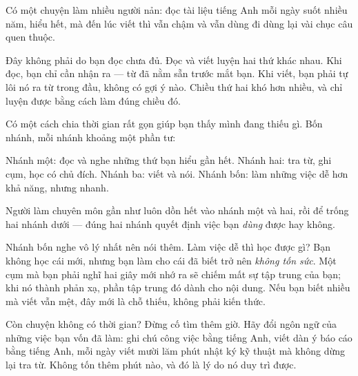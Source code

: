 \documentclass[../../english.tex]{subfiles}
\begin{document}
\begin{dongian}
Có một chuyện làm nhiều người nản: đọc tài liệu tiếng Anh mỗi ngày suốt nhiều năm, hiểu hết, mà đến lúc viết thì vẫn chậm và vẫn dùng đi dùng lại vài chục câu quen thuộc.

Đây không phải do bạn đọc chưa đủ. Đọc và viết luyện hai thứ khác nhau. Khi đọc, bạn chỉ cần nhận ra --- từ đã nằm sẵn trước mắt bạn. Khi viết, bạn phải tự lôi nó ra từ trong đầu, không có gợi ý nào. Chiều thứ hai khó hơn nhiều, và chỉ luyện được bằng cách làm đúng chiều đó.

Có một cách chia thời gian rất gọn giúp bạn thấy mình đang thiếu gì. Bốn nhánh, mỗi nhánh khoảng một phần tư:

Nhánh một: đọc và nghe những thứ bạn hiểu gần hết. Nhánh hai: tra từ, ghi cụm, học có chủ đích. Nhánh ba: viết và nói. Nhánh bốn: làm những việc dễ hơn khả năng, nhưng nhanh.

Người làm chuyên môn gần như luôn dồn hết vào nhánh một và hai, rồi để trống hai nhánh dưới --- đúng hai nhánh quyết định việc bạn \emph{dùng} được hay không.

Nhánh bốn nghe vô lý nhất nên nói thêm. Làm việc dễ thì học được gì? Bạn không học cái mới, nhưng bạn làm cho cái đã biết trở nên \emph{không tốn sức}. Một cụm mà bạn phải nghĩ hai giây mới nhớ ra sẽ chiếm mất sự tập trung của bạn; khi nó thành phản xạ, phần tập trung đó dành cho nội dung. Nếu bạn biết nhiều mà viết vẫn mệt, đây mới là chỗ thiếu, không phải kiến thức.

Còn chuyện không có thời gian? Đừng cố tìm thêm giờ. Hãy đổi ngôn ngữ của những việc bạn vốn đã làm: ghi chú công việc bằng tiếng Anh, viết dàn ý báo cáo bằng tiếng Anh, mỗi ngày viết mười lăm phút nhật ký kỹ thuật mà không dừng lại tra từ. Không tốn thêm phút nào, và đó là lý do nó duy trì được.
\end{dongian}
\end{document}

